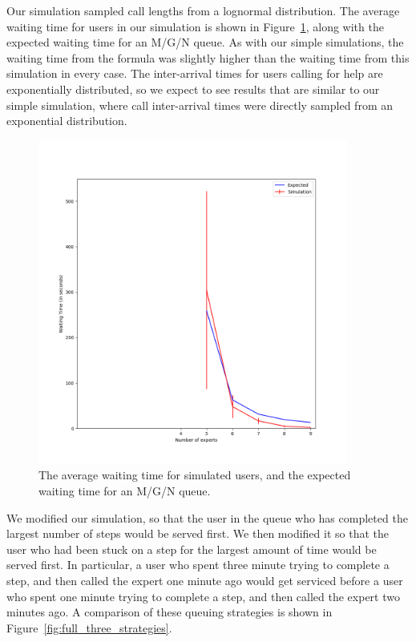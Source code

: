 Our simulation sampled call lengths from a lognormal distribution.
The average waiting time for users in our simulation is shown in
Figure~\ref{fig:full_expected_sim}, along with the expected waiting time for an
M/G/N queue.
As with our simple simulations, the waiting time from the formula was slightly
higher than the waiting time from this simulation in every case.
The inter-arrival times for users calling for help are exponentially
distributed, so we expect to see results that are similar to our simple
simulation, where call inter-arrival times were directly sampled from an
exponential distribution.

\begin{figure}[h]
  \includegraphics[width=4in]{figures/montecarlo/full_expected_sim.png}
  \caption{
    The average waiting time for simulated users, and the expected waiting time
    for an M/G/N queue.
  }\label{fig:full_expected_sim}
\end{figure}

We modified our simulation, so that the user in the queue who has completed the
largest number of steps would be served first.
We then modified it so that the user who had been stuck on a step for the
largest amount of time would be served first.
In particular, a user who spent three minute trying to complete a step, and then
called the expert one minute ago would get serviced before a user who spent one
minute trying to complete a step, and then called the expert two minutes ago.
A comparison of these queuing strategies is shown in
Figure~\ref{fig:full_three_strategies}.

